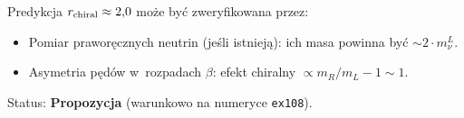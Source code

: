\begin{remark}[Falsyfikowalno\'s\'c]\label{rem:K2-falsyfikacja}
Predykcja $r_{\rm chiral} \approx 2{,}0$ mo\.ze by\'c
zweryfikowana przez:
\begin{itemize}[nosep]
  \item Pomiar prawor\k{e}cznych neutrin (je\'sli istniej\k{a}):
        ich masa powinna by\'c $\sim 2 \cdot m_\nu^L$.
  \item Asymetria p\k{e}d\'ow w~rozpadach $\beta$:
        efekt chiralny $\propto m_R/m_L - 1 \sim 1$.
\end{itemize}
Status: \textbf{Propozycja} (warunkowo na numeryce \texttt{ex108}).
\end{remark}
